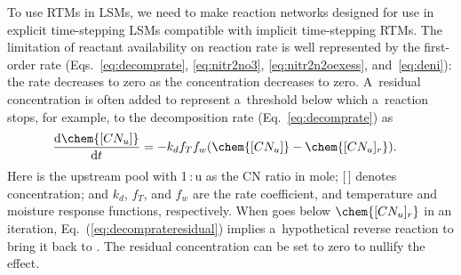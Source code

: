 \documentclass[gmd,noline]{copernicus}
\begin{document}
      To use RTMs in LSMs, we need to make reaction networks designed for
      use in explicit time-stepping LSMs compatible with implicit time-stepping RTMs. The limitation of reactant availability on reaction
      rate is well represented by the first-order rate
      (Eqs.~\ref{eq:decomprate}, \ref{eq:nitr2no3}, \ref{eq:nitr2n2oexess},
      and~\ref{eq:deni}): the rate decreases to zero as the concentration
      decreases to zero. A~residual concentration  is often
      added to represent a~threshold below which a~reaction stops, for
      example, to the decomposition rate (Eq.~\ref{eq:decomprate}) as
\begin{align}
 &
\frac{\mathrm{d} \chem{[CN_u]}}{\mathrm{d} t} =
-k_{d} f_{T} f_{w} (\chem{[CN_u]} - \chem{[CN_u]_r}).
\label{eq:decomprateresidual}
\end{align}%
      Here  is the upstream pool with 1\,:\,u as the CN ratio in
      mole; [\,] denotes concentration; and $k_{d}$, $f_{T}$, and
      $f_{w}$ are the rate coefficient, and temperature and moisture response
      functions, respectively. When  goes below
      $\chem{[CN_u]_r}$ in an iteration,
      Eq.~(\ref{eq:decomprateresidual}) implies a~hypothetical reverse
      reaction to bring it back to . The residual
      concentration can be set to zero to nullify the effect.
\end{document}
